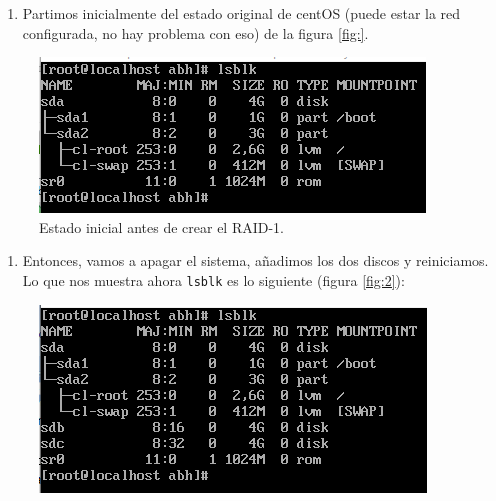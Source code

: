 \documentclass[
]{book}
\providecommand{\tightlist}{%
  \setlength{\itemsep}{0pt}\setlength{\parskip}{0pt}}
\begin{document}
\begin{enumerate}
\def\labelenumi{\arabic{enumi}.}
\tightlist
\item
  Partimos inicialmente del estado original de centOS (puede estar la red configurada, no hay problema con eso) de la figura \ref{fig:}.
\end{enumerate}

\begin{figure}

{\centering \includegraphics[width=0.95\linewidth]{images/1} 

}

\caption{Estado inicial antes de crear el RAID-1.}\label{fig:1}
\end{figure}

\begin{enumerate}
\def\labelenumi{\arabic{enumi}.}
\setcounter{enumi}{1}
\tightlist
\item
  Entonces, vamos a apagar el sistema, añadimos los dos discos y reiniciamos. Lo que nos muestra ahora \texttt{lsblk} es lo siguiente (figura \ref{fig:2}):
\end{enumerate}

\begin{figure}

{\centering \includegraphics[width=0.95\linewidth]{images/2} 

}

\end{figure}
\end{document}
